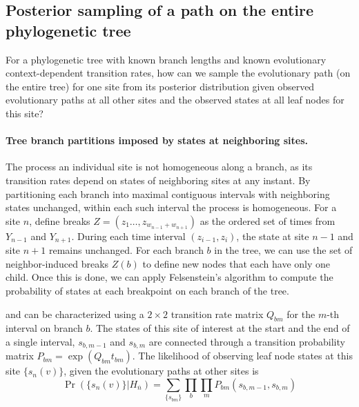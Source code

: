 \documentclass[11pt]{article}
\begin{document}
\subsection{Posterior sampling of a path on the entire phylogenetic tree}

For a phylogenetic tree with known branch lengths and known
evolutionary context-dependent transition rates, how can we sample the
evolutionary path (on the entire tree) for one site from its posterior
distribution given observed evolutionary paths at all other sites and the
observed states at all leaf nodes for this site?

\paragraph{Tree branch partitions imposed by states at neighboring sites.}
The process an individual site is not homogeneous along a branch, as
its transition rates depend on states of neighboring sites at any
instant. By partitioning each branch into maximal contiguous intervals
with neighboring states unchanged, within each such interval the
process is homogeneous. For a site $n$, define breaks $Z =
(z_1\ldots,z_{w_{n-1} + w_{n+1}})$ as the ordered set of times from
$Y_{n-1}$ and $Y_{n+1}$. During each time interval $(z_{i-1}, z_{i})$,
the state at site $n-1$ and site $n+1$ remains unchanged.  For each
branch $b$ in the tree, we can use the set of neighbor-induced breaks
$Z(b)$ to define new nodes that each have only one child. Once this is
done, we can apply Felsenstein's algorithm to compute the probability
of states at each breakpoint on each branch of the tree.


and can be characterized using a $2\times2$ transition rate matrix
$Q_{bm}$ for the $m$-th interval on branch $b$. The states of this
site of interest at the start and the end of a single interval,
$s_{b,m-1}$ and $s_{b,m}$ are connected through a transition
probability matrix $P_{bm} = \exp(Q_{bm}t_{bm})$.  The likelihood of
observing leaf node states at this site $\{s_n(v)\}$, given the
evolutionary paths at other sites is
\[
\Pr(\{s_n(v)\} | H_{\overline{n}}) = \sum_{\{s_{bm}\}} \prod_{b} \prod_{m} P_{bm}(s_{b,m-1}, s_{b, m})
\]

\end{document}
